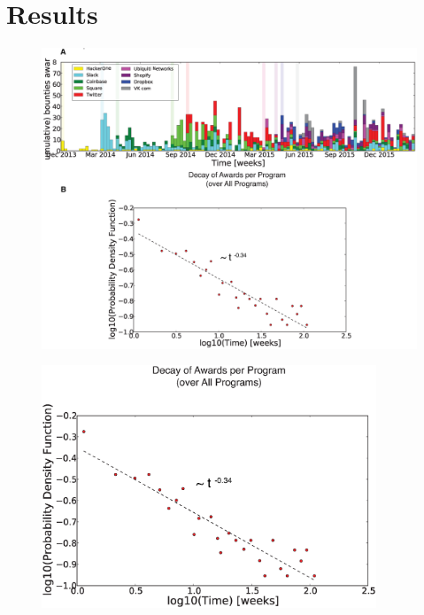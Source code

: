 \section{Results}
\label{sec:results}

\begin{figure}
\begin{center}
\includegraphics[width=17cm]{figures/timeline.eps}
\caption{}
\label{ }
\end{center}
\end{figure}

\begin{figure}
\begin{center}
\includegraphics[width=10cm]{figures/decay.eps}
\caption{}
\label{ }
\end{center}
\end{figure}


